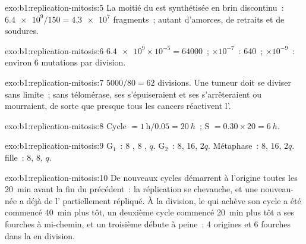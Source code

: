 \begin{solution}{exo:b1:replication-mitosis:5}
La moitié du  est synthétisée en brin discontinu~: $\num{6.4e9}/150 =
\num{4.3e7}$ fragments~; autant d'amorces, de retraits et de soudures.
\end{solution}

\begin{solution}{exo:b1:replication-mitosis:6}
$\num{6.4e9}\times 10^{-5} = \num{64000}$~; $\times 10^{-7}$~: 640~;
$\times 10^{-9}$~: environ 6 mutations par division.
\end{solution}

\begin{solution}{exo:b1:replication-mitosis:7}
$5000/80 = 62$ divisions. Une tumeur doit se diviser sans limite~; sans
télomérase, ses  s'épuiseraient et ses  s'arrêteraient
ou mourraient, de sorte que presque tous les cancers réactivent
l'.
\end{solution}

\begin{solution}{exo:b1:replication-mitosis:8}
Cycle $= 1\,\mathrm{h}/0.05 = \qty{20}{h}$~; S $= 0.30\times 20 =
\qty{6}{h}$.
\end{solution}

\begin{solution}{exo:b1:replication-mitosis:9}
G$_1$~: 8 , 8 , $q$. G$_2$~: 8, 16, $2q$.
Métaphase~: 8, 16, $2q$.  fille~: 8, 8, $q$.
\end{solution}

\begin{solution}{exo:b1:replication-mitosis:10}
De nouveaux cycles démarrent à l'origine toutes les \qty{20}{min} avant
la fin du précédent~: la réplication se chevauche, et une 
nouveau-née a déjà de l' partiellement répliqué. À la division, le
 qui achève son cycle a été commencé \qty{40}{min} plus tôt,
un deuxième cycle commencé \qty{20}{min} plus tôt a ses fourches à
mi-chemin, et un troisième débute à peine~: 4 origines et 6 fourches
dans la  en division.
\end{solution}

